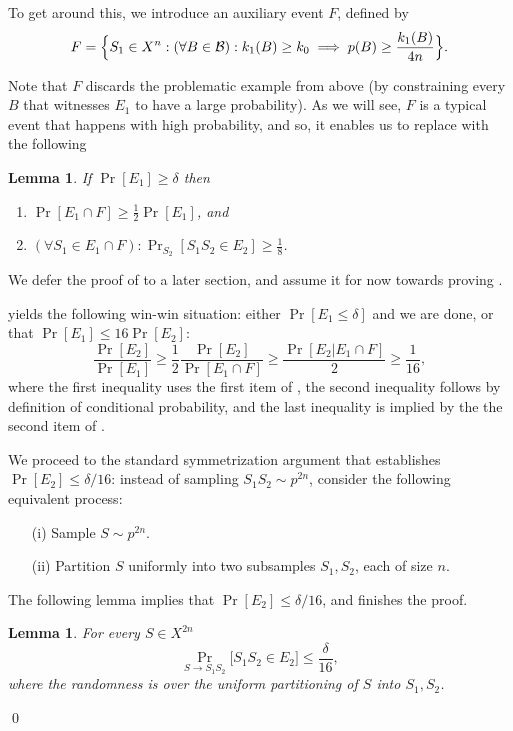 \documentclass{article}
\newtheorem{lemma}[theorem]{Lemma}
\newcommand{\B}{{\cal B}}
\begin{document}
To get around this, we introduce an auxiliary event $F$, defined by
\[F = \Bigl\{S_1\in X^{n} : (\forall B\in\B): k_{1}(B) \geq k_0 \implies p(B)\geq \frac{k_{1}(B)}{4n}\Bigr\}. \]

Note that $F$ discards the problematic example from above 
(by constraining every $B$ that witnesses $E_1$ to have a large probability). 
As we will see, $F$ is a typical event that happens with high probability,
and so, it enables us to replace  with the following
\begin{lemma}\label{lem:reduction}
If $\Pr[E_1]\geq \delta$ then 
\begin{enumerate}
\item $\Pr[E_1\cap F] \geq \frac{1}{2}\Pr[E_1]$, and
\item $(\forall S_1\in E_1\cap F): \Pr_{S_2}[S_1S_2\in E_2] \geq \frac{1}{8}$. 
\end{enumerate}
\end{lemma}
We defer the proof of  to a later section, 
and assume it for now towards proving .

 yields the following win-win situation:
either $\Pr[E_1 \leq \delta]$ and we are done, 
or that $\Pr[E_1]\leq 16\Pr[E_2]$:
\[\frac{\Pr[E_2]}{\Pr[E_1]} \geq  \frac{1}{2}\frac{\Pr[E_2]}{\Pr[E_1\cap F]} \geq \frac{\Pr[E_2 \vert E_1\cap F]}{2} \geq \frac{1}{16},\]
where the first inequality uses the first item of , 
the second inequality follows by definition of conditional probability,
and the last inequality is implied by the the second item of .


We proceed to the standard symmetrization argument
that establishes $\Pr[E_2]\leq\delta/16$:
instead of sampling $S_1S_2\sim p^{2n}$,
consider the following equivalent process:
\begin{itemize}
\item[(i)] Sample $S\sim p^{2n}$.
\item[(ii)] Partition $S$ uniformly into two subsamples $S_1,S_2$, each of size $n$.
\end{itemize}
The following lemma implies that $\Pr[E_2]\leq \delta/16$, and finishes the proof.
\begin{lemma}\label{lem:e2}
For every $S\in X^{2n}$
\[\Pr_{S\to S_1S_2}\bigl[S_1S_2\in E_2\bigr]\leq \frac{\delta}{16},\]
where the randomness is over the uniform partitioning
of $S$ into $S_1,S_2$.
\end{lemma}
\qed
\end{document}
